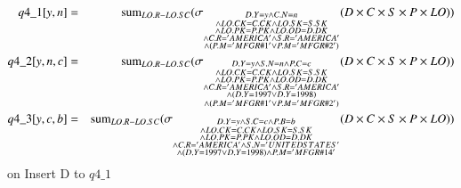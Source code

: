 \begin{eqnarray}
q4\_1[y, n] &=& \mathrm{sum}_{LO.R - LO.SC} 
  (\sigma_{\substack{ D.Y = y \wedge C.N = n \\\wedge LO.CK = C.CK \wedge LO.SK = S.SK \\\wedge LO.PK = P.PK \wedge LO.OD = D.DK \\\wedge C.R = 'AMERICA' \wedge S.R = 'AMERICA' \\\wedge ( P.M = 'MFGR\#1' \vee P.M = 'MFGR\#2')}} (D \times C \times S \times P \times LO ))\\
q4\_2[y, n, c] &=& \mathrm{sum}_{LO.R - LO.SC}
  (\sigma_{\substack{ D.Y = y \wedge S.N = n \wedge P.C = c \\\wedge LO.CK = C.CK \wedge LO.SK = S.SK \\\wedge LO.PK = P.PK \wedge LO.OD = D.DK \\\wedge C.R = 'AMERICA' \wedge S.R = 'AMERICA' \\\wedge (D.Y = 1997 \vee D.Y = 1998) \\\wedge ( P.M ='MFGR\#1' \vee P.M = 'MFGR\#2')}} (D \times C \times S \times P \times LO))\\
q4\_3[y, c, b] &=& \mathrm{sum}_{LO.R - LO.SC}
  (\sigma_{\substack{ D.Y = y \wedge S.C = c \wedge P.B = b \\\wedge LO.CK = C.CK \wedge LO.SK = S.SK \\\wedge LO.PK = P.PK \wedge LO.OD = D.DK \\\wedge C.R = 'AMERICA' \wedge S.N = 'UNITED STATES' \\\wedge (D.Y = 1997 \vee D.Y = 1998) \wedge P.M ='MFGR\#14' }} (D \times C \times S \times P \times LO))
\end{eqnarray}
on Insert D to $q4\_1$\\
